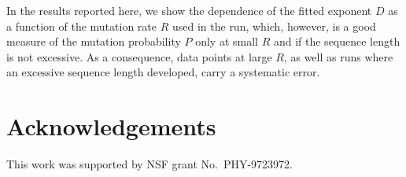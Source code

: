 \documentclass[letterpaper]{article}
\begin{document}
In the results reported here, we show the dependence of the fitted
exponent $D$ as a function of the mutation rate $R$ used in the run,
which, however, is a good measure of the mutation probability $P$ only
at small $R$ and if the sequence length is not excessive. As a
consequence, data points at large $R$, as well as runs where an
excessive sequence length developed, carry a systematic error.

\section{Acknowledgements}

This work was supported by NSF grant No.\ PHY-9723972.

\footnotesize


\end{document}
